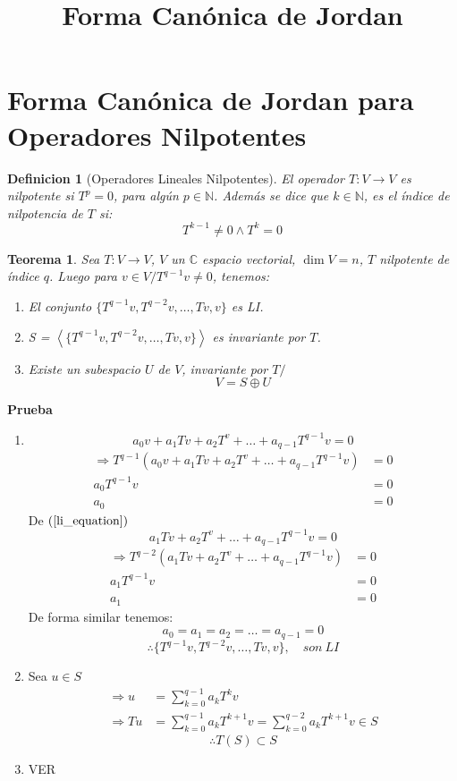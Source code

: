 \documentclass[10pt,a4paper]{article}
\title{Forma Canónica de Jordan}
\newtheorem{mydef}{Definicion}[section]
\newtheorem{mytheo}{Teorema}
\begin{document}
\maketitle


\section{Forma Canónica de Jordan para Operadores Nilpotentes}
\begin{mydef}[Operadores Lineales Nilpotentes]
	El operador $T:V\rightarrow V$ es nilpotente si $T^{p} = 0$, para algún $p\in\mathbb{N}$. Además se dice que $k\in\mathbb{N}$, es el índice de nilpotencia de $T$ si:
$$T^{k-1}\neq 0 \wedge T^{k} = 0$$

\end{mydef}

\begin{mytheo}\label{theo_nilpotentes}
	Sea $T:V\rightarrow V$, $V$ un $\mathbb{C}$ espacio vectorial, $\dim V = n$, $T$ nilpotente de índice $q$. Luego para $v\in V/ T^{q-1}v\neq 0$, tenemos:
	\begin{enumerate}
		\item El conjunto $\{T^{q-1}v, T^{q-2}v,\ldots,Tv, v\}$ es LI.
		\item S = $\left<\{T^{q-1}v, T^{q-2}v,\ldots,Tv, v\}\right>$ es invariante por $T$.
		\item Existe un subespacio $U$ de $V$, invariante por $T/$
		$$V = S\oplus U$$
	\end{enumerate}
\end{mytheo}

\textbf{Prueba}
\begin{enumerate}
	\item \begin{equation}\label{li_equation}
		a_{0}v + a_{1}Tv + a_{2}T^{v} + \ldots + a_{q-1}T^{q-1}v = 0
	\end{equation}
	\begin{align*}
		\Rightarrow T^{q-1}\left(a_{0}v + a_{1}Tv + a_{2}T^{v} + \ldots + a_{q-1}T^{q-1}v\right) & = 0\\
		a_{0}T^{q-1}v &= 0\\
		a_{0} &= 0
	\end{align*}
	De $(\ref{li_equation})$
	$$a_{1}Tv + a_{2}T^{v} + \ldots + a_{q-1}T^{q-1}v = 0$$
	\begin{align*}
		\Rightarrow T^{q-2}\left(a_{1}Tv + a_{2}T^{v} + \ldots + a_{q-1}T^{q-1}v\right) & = 0\\
		a_{1}T^{q-1}v &= 0\\
		a_{1} &= 0
	\end{align*}
	De forma similar tenemos:
		$$a_{0} = a_{1} = a_{2} = \ldots = a_{q-1} = 0$$
		$$\therefore \{T^{q-1}v, T^{q-2}v,\ldots,Tv, v\},\quad son \:LI$$
	\item Sea $ u\in S$
		\begin{align*}
			\Rightarrow u &= \sum_{k=0}^{q-1}a_{k}T^{k}v\\
			\Rightarrow Tu &=  \sum_{k=0}^{q-1}a_{k}T^{k+1}v = \sum_{k=0}^{q-2}a_{k}T^{k+1}v\in S
		\end{align*}
		$$\therefore T(S)\subset S$$
	\item VER
\end{enumerate}
\end{document}
